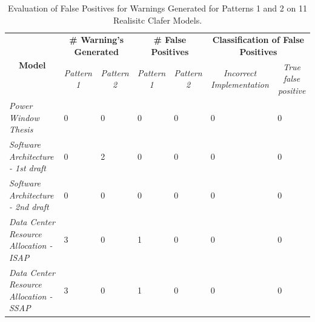 \documentclass[10pt,oneside]{IEEEtran}
\begin{document}
\begin{table}[ht]
\centering
\caption{Evaluation of False Positives for Warnings Generated for Patterns 1 and 2 on 11 Realisitc Clafer Models.}
\label{lst:falsePositive}
\begin{tabular}{@{}l|llllll@{}}
\multicolumn{1}{c|}{\multirow{2}{*}{{\bf Model}}} & \multicolumn{2}{c|}{{\bf \# Warning's Generated}}                         & \multicolumn{2}{c}{{\bf \# False Positives}}                              & \multicolumn{2}{c}{{\bf Classification of False Positives}}                                        \\ \cmidrule(l){2-7}
\multicolumn{1}{c|}{}                             & \multicolumn{1}{c}{{\it Pattern 1}} & \multicolumn{1}{c}{{\it Pattern 2}} & \multicolumn{1}{c}{{\it Pattern 1}} & \multicolumn{1}{c}{{\it Pattern 2}} & \multicolumn{1}{c}{{\it Incorrect Implementation}} & \multicolumn{1}{c}{{\it True false positive}} \\ \midrule
{\it Power Window Thesis}                         & 0                                   & 0                                   & 0                                   & 0                                   & 0                                                  & 0                                             \\ \midrule
{\it Software Architecture - 1st draft}           & 0                                   & 2                                   & 0                                   & 0                                   & 0                                                  & 0                                             \\ \midrule
{\it Software Architecture - 2nd draft}           & 0                                   & 0                                   & 0                                   & 0                                   & 0                                                  & 0                                             \\ \midrule
{\it Data Center Resource Allocation - ISAP}      & 3                                   & 0                                   & 1                                   & 0                                   & 0                                                  & 0                                             \\ \midrule
{\it Data Center Resource Allocation - SSAP}      & 3                                   & 0                                   & 1                                   & 0                                   & 0                                                  & 0                                             \\ \midrule

\end{tabular}
\end{table}
\end{document}
